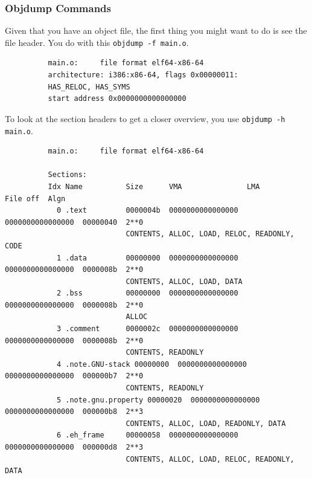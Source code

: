 \documentclass{article}
\begin{document}
      \begin{definition}[Mach-O]
        
      \end{definition}

    \subsubsection{Objdump Commands}

      \begin{theorem}
        Given that you have an object file, the first thing you might want to do is see the file header. You do with this \texttt{objdump -f main.o}. 
        \begin{lstlisting}
          main.o:     file format elf64-x86-64
          architecture: i386:x86-64, flags 0x00000011:
          HAS_RELOC, HAS_SYMS
          start address 0x0000000000000000
        \end{lstlisting}
      \end{theorem}

      \begin{theorem}
        To look at the section headers to get a closer overview, you use \texttt{objdump -h main.o}. 
        \begin{lstlisting}
          main.o:     file format elf64-x86-64

          Sections:
          Idx Name          Size      VMA               LMA               File off  Algn
            0 .text         0000004b  0000000000000000  0000000000000000  00000040  2**0
                            CONTENTS, ALLOC, LOAD, RELOC, READONLY, CODE
            1 .data         00000000  0000000000000000  0000000000000000  0000008b  2**0
                            CONTENTS, ALLOC, LOAD, DATA
            2 .bss          00000000  0000000000000000  0000000000000000  0000008b  2**0
                            ALLOC
            3 .comment      0000002c  0000000000000000  0000000000000000  0000008b  2**0
                            CONTENTS, READONLY
            4 .note.GNU-stack 00000000  0000000000000000  0000000000000000  000000b7  2**0
                            CONTENTS, READONLY
            5 .note.gnu.property 00000020  0000000000000000  0000000000000000  000000b8  2**3
                            CONTENTS, ALLOC, LOAD, READONLY, DATA
            6 .eh_frame     00000058  0000000000000000  0000000000000000  000000d8  2**3
                            CONTENTS, ALLOC, LOAD, RELOC, READONLY, DATA
        \end{lstlisting}
      \end{theorem}
\end{document}
